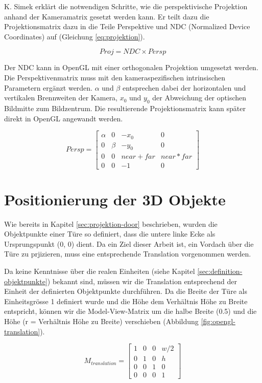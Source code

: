 K. Simek \cite{simek} erklärt die notwendigen Schritte, wie die perspektivische Projektion anhand der Kameramatrix gesetzt werden kann. Er teilt dazu die Projektionsmatrix dazu in die Teile Perspektive und NDC (Normalized Device Coordinates) auf (Gleichung \ref{eq:projektion}).

\begin{equation}
Proj = NDC \times Persp
\label{eq:projektion}
\end{equation}

Der NDC kann in OpenGL mit einer orthogonalen Projektion umgesetzt werden. Die Perspektivenmatrix muss mit den kameraspezifischen intrinsischen Parametern ergänzt werden. $\alpha$ und $\beta$ entsprechen dabei der horizontalen und vertikalen Brennweiten der Kamera, $x_0$ und $y_0$ der Abweichung der optischen Bildmitte zum Bildzentrum. Die resultierende Projektionsmatrix kann später direkt in OpenGL angewandt werden.

\begin{equation}
Persp
=
\begin{bmatrix}
\alpha & 0 & -x_0 & 0 \\
0 & \beta & -y_0 & 0 \\
0 & 0 & near + far & near * far \\
0 & 0 & -1 & 0
\end{bmatrix} 
\end{equation}


\section{Positionierung der 3D Objekte}

Wie bereits in Kapitel \ref{sec:projektion-door} beschrieben, wurden die Objektpunkte einer Türe so definiert, dass die untere linke Ecke als Ursprungspunkt (0, 0) dient. Da ein Ziel dieser Arbeit ist, ein Vordach über die Türe zu prjizieren, muss eine entsprechende Translation vorgenommen werden.

Da keine Kenntnisse über die realen Einheiten (siehe Kapitel \ref{sec:definition-objektpunkte}) bekannt sind, müssen wir die Translation entsprechend der Einheit der definierten Objektpunkte durchführen. Da die Breite der Türe als Einheitsgrösse 1 definiert wurde und die Höhe dem Verhältnis Höhe zu Breite entspricht, können wir die Model-View-Matrix um die halbe Breite (0.5) und die Höhe (r = Verhältnis Höhe zu Breite) verschieben (Abbildung \ref{fig:opengl-translation}).

\begin{equation}
M_{translation}
=
\begin{bmatrix}
1 & 0 & 0 & w/2 \\
0 & 1 & 0 & h \\
0 & 0 & 1 & 0 \\
0 & 0 & 0 & 1
\end{bmatrix} 
\end{equation}


